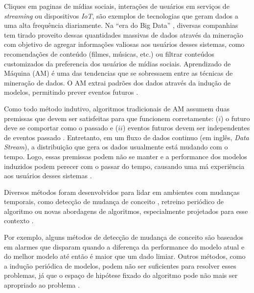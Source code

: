 Cliques em paginas de mídias sociais, interações de usuários em serviços de \textit{streaming} ou dispositivos \textit{IoT}, são exemplos de tecnologias que geram dados a uma alta frequência diariamente.
Na ``era do Big Data'' \cite{tarnoff2018big, finger2014data},
diversas companhias tem tirado proveito dessas quantidades massivas de dados através da mineração com objetivo de agregar informações valiosas aos usuários desses sistemas, como recomendações de conteúdo (filmes, músicas, etc.) ou filtrar conteúdos customizados da preferencia dos usuários de mídias sociais. Aprendizado de Máquina (AM) é uma das tendencias que se sobressaem entre as técnicas de mineração de dados. O AM extrai padrões dos dados através da indução de modelos, permitindo prever eventos futuros \cite{mitchell1997machine,friedman2001elements}.

Como todo método indutivo, algoritmos tradicionais de AM assumem duas premissas que devem ser satisfeitas para que funcionem corretamente: ($i$) o futuro deve se comportar como o passado e ($ii$) eventos futuros devem ser independentes de eventos passado \cite{vapnik2013nature}.
Entretanto, em um fluxo de dados continuo (em inglês, \textit{Data Stream}), a distribuição que gera os dados usualmente está mudando com o tempo.
Logo, essas premissas podem não se manter e a performance dos modelos induzidos podem perecer com o passar do tempo, causando uma má experiência aos usuários desses sistemas  \cite{gama2007learning, Johansson2014}. 

Diversos métodos foram desenvolvidos para lidar em ambientes com mudanças temporais, como detecção de mudança de conceito \cite{klinkenberg2000detecting}, retreino periódico de algoritmo \cite{bifet2007learning} ou novas abordagens de algoritmos, especialmente projetados para esse contexto \cite{zang2014comparative}.

Por exemplo, alguns métodos de detecção de mudança de conceito \cite{gama2010knowledge} são baseados em alarmes que disparam quando a diferença da performance do modelo atual e do melhor modelo até então é maior que um dado limiar.
Outros métodos, como a indução periódica de modelos, podem não ser suficientes para resolver esses problemas, já que o espaço de hipótese fixado do algoritmo pode não mais ser apropriado ao problema \cite{rossi2014metastream}.

